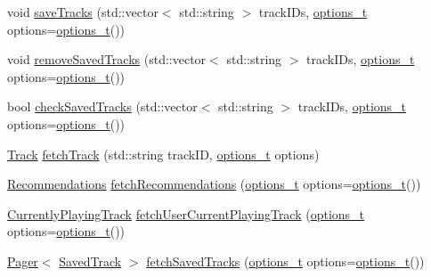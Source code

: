 \begin{DoxyCompactItemize}
\item 
void \mbox{\hyperlink{class_spotify_a_p_i_a385e1e97af9b2f8b22ac0538c6f410a1}{save\+Tracks}} (std\+::vector$<$ std\+::string $>$ track\+I\+Ds, \mbox{\hyperlink{_spotify_a_p_i_8h_a0ff5cac1a4007bb330b7d9939650c283}{options\+\_\+t}} options=\mbox{\hyperlink{_spotify_a_p_i_8h_a0ff5cac1a4007bb330b7d9939650c283}{options\+\_\+t}}())
\item 
void \mbox{\hyperlink{class_spotify_a_p_i_af844cb101057f17077fe1cfdd2d77c3b}{remove\+Saved\+Tracks}} (std\+::vector$<$ std\+::string $>$ track\+I\+Ds, \mbox{\hyperlink{_spotify_a_p_i_8h_a0ff5cac1a4007bb330b7d9939650c283}{options\+\_\+t}} options=\mbox{\hyperlink{_spotify_a_p_i_8h_a0ff5cac1a4007bb330b7d9939650c283}{options\+\_\+t}}())
\item 
bool \mbox{\hyperlink{class_spotify_a_p_i_a455d2433471b1bbeedcf1003e56c3381}{check\+Saved\+Tracks}} (std\+::vector$<$ std\+::string $>$ track\+I\+Ds, \mbox{\hyperlink{_spotify_a_p_i_8h_a0ff5cac1a4007bb330b7d9939650c283}{options\+\_\+t}} options=\mbox{\hyperlink{_spotify_a_p_i_8h_a0ff5cac1a4007bb330b7d9939650c283}{options\+\_\+t}}())
\item 
\mbox{\hyperlink{class_track}{Track}} \mbox{\hyperlink{class_spotify_a_p_i_a3244fda7378b2315accdf00f2d22e40f}{fetch\+Track}} (std\+::string track\+ID, \mbox{\hyperlink{_spotify_a_p_i_8h_a0ff5cac1a4007bb330b7d9939650c283}{options\+\_\+t}} options)
\item 
\mbox{\hyperlink{class_recommendations}{Recommendations}} \mbox{\hyperlink{class_spotify_a_p_i_a22c839c61fa06ac212d1c38a0ca5cd2f}{fetch\+Recommendations}} (\mbox{\hyperlink{_spotify_a_p_i_8h_a0ff5cac1a4007bb330b7d9939650c283}{options\+\_\+t}} options=\mbox{\hyperlink{_spotify_a_p_i_8h_a0ff5cac1a4007bb330b7d9939650c283}{options\+\_\+t}}())
\item 
\mbox{\hyperlink{class_currently_playing_track}{Currently\+Playing\+Track}} \mbox{\hyperlink{class_spotify_a_p_i_a805c3d61009c9d153665329916c887cf}{fetch\+User\+Current\+Playing\+Track}} (\mbox{\hyperlink{_spotify_a_p_i_8h_a0ff5cac1a4007bb330b7d9939650c283}{options\+\_\+t}} options=\mbox{\hyperlink{_spotify_a_p_i_8h_a0ff5cac1a4007bb330b7d9939650c283}{options\+\_\+t}}())
\item 
\mbox{\hyperlink{class_pager}{Pager}}$<$ \mbox{\hyperlink{class_saved_track}{Saved\+Track}} $>$ \mbox{\hyperlink{class_spotify_a_p_i_a2e725426d46ab8395940048e2acb9fbc}{fetch\+Saved\+Tracks}} (\mbox{\hyperlink{_spotify_a_p_i_8h_a0ff5cac1a4007bb330b7d9939650c283}{options\+\_\+t}} options=\mbox{\hyperlink{_spotify_a_p_i_8h_a0ff5cac1a4007bb330b7d9939650c283}{options\+\_\+t}}())

\end{DoxyCompactItemize}

